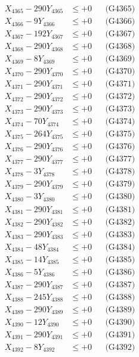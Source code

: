 \documentclass[a4paper,10pt]{article}
\begin{document}
{\begin{align}
X_{4365} - 290Y_{4365} &\leq +0 && \text{(G4365)} \\
X_{4366} - 9Y_{4366} &\leq +0 && \text{(G4366)} \\
X_{4367} - 192Y_{4367} &\leq +0 && \text{(G4367)} \\
X_{4368} - 290Y_{4368} &\leq +0 && \text{(G4368)} \\
X_{4369} - 8Y_{4369} &\leq +0 && \text{(G4369)} \\
X_{4370} - 290Y_{4370} &\leq +0 && \text{(G4370)} \\
\allowbreak
X_{4371} - 290Y_{4371} &\leq +0 && \text{(G4371)} \\
X_{4372} - 290Y_{4372} &\leq +0 && \text{(G4372)} \\
X_{4373} - 290Y_{4373} &\leq +0 && \text{(G4373)} \\
X_{4374} - 70Y_{4374} &\leq +0 && \text{(G4374)} \\
X_{4375} - 264Y_{4375} &\leq +0 && \text{(G4375)} \\
X_{4376} - 290Y_{4376} &\leq +0 && \text{(G4376)} \\
X_{4377} - 290Y_{4377} &\leq +0 && \text{(G4377)} \\
X_{4378} - 3Y_{4378} &\leq +0 && \text{(G4378)} \\
X_{4379} - 290Y_{4379} &\leq +0 && \text{(G4379)} \\
X_{4380} - 3Y_{4380} &\leq +0 && \text{(G4380)} \\
\allowbreak
X_{4381} - 290Y_{4381} &\leq +0 && \text{(G4381)} \\
X_{4382} - 290Y_{4382} &\leq +0 && \text{(G4382)} \\
X_{4383} - 290Y_{4383} &\leq +0 && \text{(G4383)} \\
X_{4384} - 48Y_{4384} &\leq +0 && \text{(G4384)} \\
X_{4385} - 14Y_{4385} &\leq +0 && \text{(G4385)} \\
X_{4386} - 5Y_{4386} &\leq +0 && \text{(G4386)} \\
X_{4387} - 290Y_{4387} &\leq +0 && \text{(G4387)} \\
X_{4388} - 245Y_{4388} &\leq +0 && \text{(G4388)} \\
X_{4389} - 290Y_{4389} &\leq +0 && \text{(G4389)} \\
X_{4390} - 12Y_{4390} &\leq +0 && \text{(G4390)} \\
\allowbreak
X_{4391} - 290Y_{4391} &\leq +0 && \text{(G4391)} \\
X_{4392} - 8Y_{4392} &\leq +0 && \text{(G4392)} \\

\end{align}}
\end{document}
